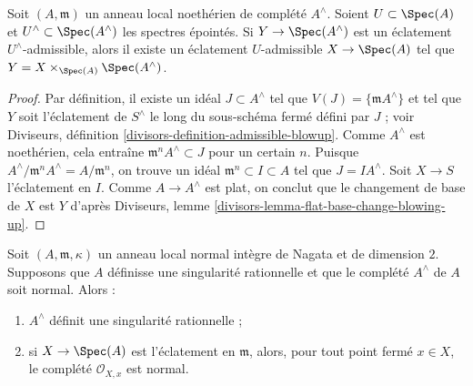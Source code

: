 \begin{lemma} \label{lemma-descend-admissible-blowup} Soit $(A, \mathfrak m)$ un anneau local noethérien de complété $A^\wedge$. Soient $U \subset \Spec(A)$ et $U^\wedge \subset \Spec(A^\wedge)$ les spectres épointés. Si $Y \to \Spec(A^\wedge)$ est un éclatement $U^\wedge$-admissible, alors il existe un éclatement $U$-admissible $X \to \Spec(A)$ tel que $Y = X \times_{\Spec(A)} \Spec(A^\wedge)$. \end{lemma}

\begin{proof} Par définition, il existe un idéal $J \subset A^\wedge$ tel que $V(J) = \{\mathfrak m A^\wedge\}$ et tel que $Y$ soit l'éclatement de $S^\wedge$ le long du sous-schéma fermé défini par $J$ ; voir Diviseurs, définition \ref{divisors-definition-admissible-blowup}. Comme $A^\wedge$ est noethérien, cela entraîne $\mathfrak m^n A^\wedge \subset J$ pour un certain $n$. Puisque $A^\wedge/\mathfrak m^n A^\wedge = A/\mathfrak m^n$, on trouve un idéal $\mathfrak m^n \subset I \subset A$ tel que $J = I A^\wedge$. Soit $X \to S$ l'éclatement en $I$. Comme $A \to A^\wedge$ est plat, on conclut que le changement de base de $X$ est $Y$ d'après Diviseurs, lemme \ref{divisors-lemma-flat-base-change-blowing-up}. \end{proof}

\begin{lemma} \label{lemma-blowup-still-good} Soit $(A, \mathfrak m, \kappa)$ un anneau local normal intègre de Nagata et de dimension $2$. Supposons que $A$ définisse une singularité rationnelle et que le complété $A^\wedge$ de $A$ soit normal. Alors : \begin{enumerate} \item $A^\wedge$ définit une singularité rationnelle ; \item si $X \to \Spec(A)$ est l'éclatement en $\mathfrak m$, alors, pour tout point fermé $x \in X$, le complété $\mathcal{O}_{X, x}$ est normal. \end{enumerate} \end{lemma}

